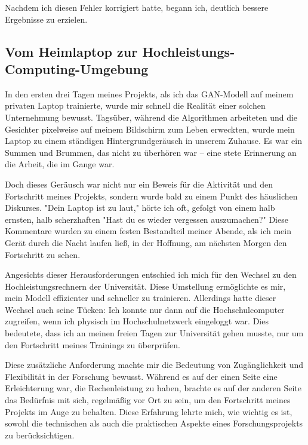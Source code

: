 \documentclass[a4paper, 12pt]{article}
\begin{document}
Nachdem ich diesen Fehler korrigiert hatte, begann ich, deutlich bessere Ergebnisse zu erzielen.

\subsection{Vom Heimlaptop zur Hochleistungs-Computing-Umgebung}
In den ersten drei Tagen meines Projekts, als ich das GAN-Modell auf meinem privaten Laptop trainierte, wurde mir schnell die Realität einer solchen Unternehmung bewusst. Tagsüber, während die Algorithmen arbeiteten und die Gesichter pixelweise auf meinem Bildschirm zum Leben erweckten, wurde mein Laptop zu einem ständigen Hintergrundgeräusch in unserem Zuhause. Es war ein Summen und Brummen, das nicht zu überhören war – eine stete Erinnerung an die Arbeit, die im Gange war.

Doch dieses Geräusch war nicht nur ein Beweis für die Aktivität und den Fortschritt meines Projekts, sondern wurde bald zu einem Punkt des häuslichen Diskurses. "Dein Laptop ist zu laut," hörte ich oft, gefolgt von einem halb ernsten, halb scherzhaften "Hast du es wieder vergessen auszumachen?" Diese Kommentare wurden zu einem festen Bestandteil meiner Abende, als ich mein Gerät durch die Nacht laufen ließ, in der Hoffnung, am nächsten Morgen den Fortschritt zu sehen.

Angesichts dieser Herausforderungen entschied ich mich für den Wechsel zu den Hochleistungsrechnern der Universität. Diese Umstellung ermöglichte es mir, mein Modell effizienter und schneller zu trainieren. Allerdings hatte dieser Wechsel auch seine Tücken: Ich konnte nur dann auf die Hochschulcomputer zugreifen, wenn ich physisch im Hochschulnetzwerk eingeloggt war. Dies bedeutete, dass ich an meinen freien Tagen zur Universität gehen musste, nur um den Fortschritt meines Trainings zu überprüfen.

Diese zusätzliche Anforderung machte mir die Bedeutung von Zugänglichkeit und Flexibilität in der Forschung bewusst. Während es auf der einen Seite eine Erleichterung war, die Rechenleistung zu haben, brachte es auf der anderen Seite das Bedürfnis mit sich, regelmäßig vor Ort zu sein, um den Fortschritt meines Projekts im Auge zu behalten. Diese Erfahrung lehrte mich, wie wichtig es ist, sowohl die technischen als auch die praktischen Aspekte eines Forschungsprojekts zu berücksichtigen.
\end{document}
